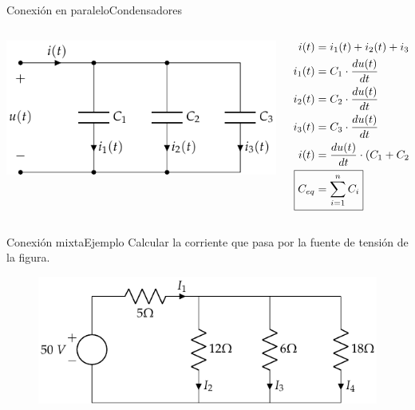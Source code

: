 \documentclass[aspectratio=169, xcolor={usenames,svgnames,dvipsnames}]{beamer}
\begin{document}
\begin{frame}{Conexión en paralelo}{Condensadores}
\begin{columns}
\begin{column}{0.4\columnwidth}
\begin{center}
\includegraphics[width=.9\linewidth]{../figs/CondensadoresParalelo.pdf}
\end{center}
\end{column}
\begin{column}{0.6\columnwidth}
\begin{align*}
  i(t) & = i_1(t) + i_2(t) + i_3(t)\\
  i_1(t) &= C_1 \cdot \frac{du(t)}{dt}\\
  i_2(t) &= C_2 \cdot \frac{du(t)}{dt}\\
  i_3(t) &= C_3 \cdot \frac{du(t)}{dt}\\
  i(t)& = \frac{du(t)}{dt} \cdot (C_1 + C_2 + C_3)\\
  \Aboxed{C_{eq} &= \sum_{i = 1}^n C_i}
\end{align*}
\end{column}
\end{columns}
\end{frame}

\begin{frame}{Conexión mixta}{Ejemplo}
    Calcular la corriente que pasa por la fuente de tensión de la figura.
		\begin{figure}[H]
			\centering
			\includegraphics{../figs/ej1_BT1.pdf}
		\end{figure}
\end{frame}
\end{document}
